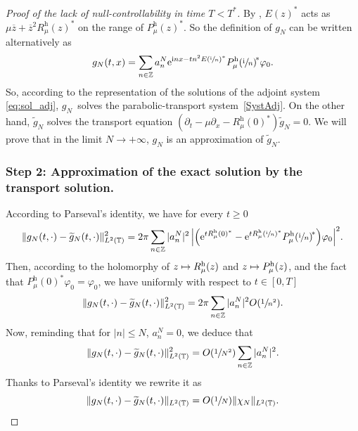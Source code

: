 \documentclass[10pt]{amsart}
\def\mto{\mathchoice{\longmapsto}{\mapsto}{\mapsto}{\mapsto}}
\theoremstyle{plain}
\theoremstyle{definition}
\theoremstyle{remark}
\let\bigO O
\newcommand{\set}{\mathbb}
\newcommand{\h}{{\mathrm h}}
\newcommand{\eu}{\mathrm e}
\newcommand{\iu}{\mathrm i}
\let\originalleft\left
\let\originalright\right
\renewcommand{\left}{\mathopen{}\mathclose\bgroup\originalleft}
\renewcommand{\right}{\aftergroup\egroup\originalright}
\newcommand{\iun}{\left(\sfrac{\iu}{n}\right)}
\begin{document}
\begin{proof}[Proof of the lack of null-controllability in time $T<T^*$]
By , $E(z)^*$ acts as $\mu\overline z + \overline z^2 R_\mu^\h(z)^*$ on the range of $P_\mu^\h(z)^*$. So the definition of $g_N$ can be written alternatively as
\[
g_N(t,x) = \sum_{n\in\set Z} a_n^N
\eu^{\iu nx-tn^2 E\iun^*}P_\mu^\h\iun^{\!*}\varphi_0.
\]
So, according to the representation of the solutions of the adjoint system \eqref{eq:sol_adj}, $g_N$~solves the parabolic-transport system~\eqref{SystAdj}. On the other hand, $\widetilde g_N$ solves the transport equation $(\partial_t-\mu\partial_x -R_\mu^\h(0)^*)\widetilde g_N = 0$. We will prove that in the limit $N\to +\infty$, $g_N$ is an approximation of $\widetilde g_N$.

\subsubsection*{Step 2: Approximation of the exact solution by the transport solution.}
According to Parseval's identity, we have for every $t\geq 0$
\[
\lVert g_N(t,\cdot)-\widetilde g_N(t,\cdot)\rVert^2_{L^2(\set T)}
= 2\pi\sum_{n\in\set Z} |a_n^N|^2\,\left| \left(
\eu^{tR_\mu^\h(0)^*} - \eu^{tR_\mu^\h\iun^*}P_\mu^\h\iun^{\!*}
\right)\varphi_0\right|^2.
\]
Then, according to the holomorphy of $z\mto R_\mu^\h(z)$ and $z\mto P_\mu^\h(z)$, and the fact that $P_\mu^\h(0)^*\varphi_0 = \varphi_0$, we have uniformly with respect to $t\in [0,T]$
\[
\lVert g_N(t,\cdot)-\widetilde g_N(t,\cdot)\rVert^2_{L^2(\set T)}
= 2\pi\sum_{n\in\set Z} |a_n^N|^2\bigO(\sfrac1{n^2}).
\]
Now, reminding that for $|n|\leq N$, $a_n^N = 0$, we deduce that
\[
\lVert g_N(t,\cdot)-\widetilde g_N(t,\cdot)\rVert^2_{L^2(\set T)}
= \bigO\left(\sfrac1{N^2}\right)\sum_{n\in\set Z} |a_n^N|^2.
\]
Thanks to Parseval's identity we rewrite it as
\begin{equation}
\label{eq:approx_gN}
\lVert g_N(t,\cdot)-\widetilde g_N(t,\cdot)\rVert_{L^2(\set T)} =
\bigO\left(\sfrac 1N\right)\lVert\chi_N\rVert_{L^2(\set T)}.
\end{equation}


\end{proof}
\end{document}
